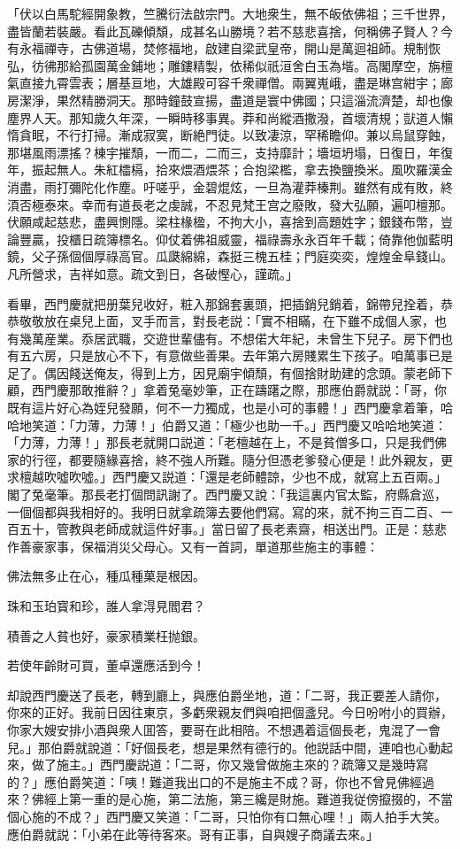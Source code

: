 「伏以白馬駝經開象教，竺騰衍法啟宗門。大地衆生，無不皈依佛祖；三千世界，盡皆蘭若裝嚴。看此瓦礫傾頽，成甚名山勝境？若不慈悲喜捨，何稱佛子賢人？今有永福禪寺，古佛道場，焚修福地，啟建自梁武皇帝，開山是萬迴祖師。規制恢弘，彷彿那給孤園萬金鋪地；雕鏤精製，依稀似祇洹舍白玉為堦。高閣摩空，旃檀氣直接九霄雲表；層基亘地，大雄殿可容千衆禪僧。兩翼嵬峨，盡是琳宫紺宇；廊房潔淨，果然精勝洞天。那時鐘鼓宣揚，盡道是寰中佛國；只這淄流濟楚，却也像塵界人天。那知歲久年深，一瞬時移事異。莽和尚縱酒撒潑，首壞清規；獃道人懶惰貪眠，不行打掃。漸成寂寞，断絶門徒。以致凄涼，罕稀瞻仰。兼以烏鼠穿蝕，那堪風雨漂搖？棟宇摧頹，一而二，二而三，支持靡計；墻垣坍塌，日復日，年復年，振起無人。朱紅櫺槅，拾來煨酒煨茶；合抱梁檻，拿去換鹽換米。風吹羅漢金消盡，雨打彌陀化作塵。吁嗟乎，金碧焜炫，一旦為灌莽榛荆。雖然有成有敗，終湏否極泰來。幸而有道長老之虔誠，不忍見梵王宫之廢敗，發大弘願，遍叩檀那。伏願咸起慈悲，盡興惻隱。梁柱椽楹，不拘大小，喜捨到高題姓字；銀錢布幣，豈論豐贏，投櫃日疏簿標名。仰仗着佛祖威靈，福祿壽永永百年千載；倚靠他伽藍明鏡，父子孫個個厚祿高官。瓜瓞綿綿，森挺三槐五桂；門庭奕奕，煌煌金阜錢山。凡所營求，吉祥如意。疏文到日，各破慳心，謹疏。」

看畢，西門慶就把册葉兒收好，粧入那錦套裏頭，把插銷兒銷着，錦帶兒拴着，恭恭敬敬放在桌兒上面，叉手而言，對長老説：「實不相瞞，在下雖不成個人家，也有幾萬産業。忝居武職，交遊世輩儘有。不想偌大年紀，未曾生下兒子。房下們也有五六房，只是放心不下，有意做些善果。去年第六房賤累生下孩子。咱萬事已是足了。偶因餞送俺友，得到上方，因見廟宇傾頹，有個捨財助建的念頭。蒙老師下顧，西門慶那敢推辭？」拿着兔毫妙筆，正在躊躇之際，那應伯爵就説：「哥，你既有這片好心為姪兒發願，何不一力獨成，也是小可的事體！」西門慶拿着筆，哈哈地笑道：「力薄，力薄！」伯爵又道：「極少也助一千。」西門慶又哈哈地笑道：「力薄，力薄！」那長老就開口説道：「老檀越在上，不是貧僧多口，只是我們佛家的行徑，都要隨緣喜捨，終不強人所難。隨分但憑老爹發心便是！此外親友，更求檀越吹噓吹噓。」西門慶又説道：「還是老師體諒，少也不成，就寫上五百兩。」閣了兔毫筆。那長老打個問訊謝了。西門慶又說：「我這裏内官太監，府縣倉巡，一個個都與我相好的。我明日就拿疏簿去要他們寫。寫的來，就不拘三百二百、一百五十，管教與老師成就這件好事。」當日留了長老素齋，相送出門。正是：慈悲作善豪家事，保福消災父母心。又有一首詞，單道那些施主的事體：

佛法無多止在心，種瓜種菓是根因。

珠和玉珀寳和珍，誰人拿淂見閻君？

積善之人貧也好，豪家積業枉抛銀。

若使年齡財可買，董卓還應活到今！

却說西門慶送了長老，轉到廳上，與應伯爵坐地，道：「二哥，我正要差人請你，你來的正好。我前日因往東京，多虧衆親友們與咱把個盞兒。今日吩咐小的買辦，你家大嫂安排小酒與衆人囬答，要哥在此相陪。不想遇着這個長老，鬼混了一會兒。」那伯爵就說道：「好個長老，想是果然有德行的。他説話中間，連咱也心動起來，做了施主。」西門慶説道：「二哥，你又幾曾做施主來的？疏簿又是幾時寫的？」應伯爵笑道：「咦！難道我出口的不是施主不成？哥，你也不曾見佛經過來？佛經上第一重的是心施，第二法施，第三纔是財施。難道我従傍攛掇的，不當個心施的不成？」西門慶又笑道：「二哥，只怕你有口無心哩！」兩人拍手大笑。應伯爵就説：「小弟在此等待客來。哥有正事，自與嫂子商議去來。」

